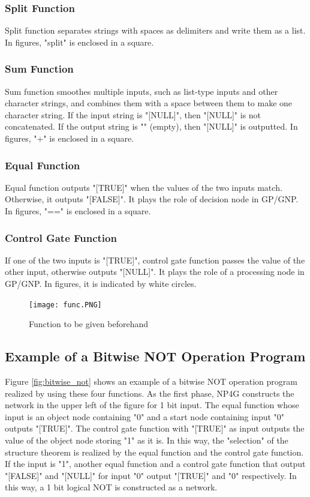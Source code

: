 \documentclass{article}
\begin{document}
\subsubsection{Split Function}
Split function separates strings with spaces as delimiters and write them as a list.
In figures, "split" is enclosed in a square.

\subsubsection{Sum Function}
Sum function smoothes multiple inputs, such as list-type inputs and other character strings, and combines them with a space between them to make one character string.
If the input string is "[NULL]", then "[NULL]" is not concatenated.
If the output string is "" (empty), then "[NULL]" is outputted.
In figures, "+" is enclosed in a square.

\subsubsection {Equal Function}
Equal function outputs "[TRUE]" when the values of the two inputs match.
Otherwise, it outputs "[FALSE]".
It plays the role of decision node in GP/GNP.
In figures, "==" is enclosed in a square.

\subsubsection {Control Gate Function}
If one of the two inputs is "[TRUE]", control gate function passes the value of the other input, otherwise outputs "[NULL]".
It plays the role of a processing node in GP/GNP.
In figures, it is indicated by white circles.

\begin{figure}[t]
\begin{center}
\texttt{[image: func.PNG]}
\end{center}
\caption {Function to be given beforehand}
\label{fig:func}
\end{figure}

\subsection {Example of a Bitwise NOT Operation Program}
Figure \ref{fig:bitwise_not} shows an example of a bitwise NOT operation program realized by using these four functions.
As the first phase, NP4G constructs the network in the upper left of the figure for 1 bit input.
The equal function whose input is an object node containing "0" and a start node containing input "0" outputs "[TRUE]".
The control gate function with "[TRUE]" as input outputs the value of the object node storing "1" as it is.
In this way, the "selection" of the structure theorem is realized by the equal function and the control gate function.
If the input is "1", another equal function and a control gate function that output "[FALSE]" and "[NULL]" for input "0" output "[TRUE]" and "0" respectively.
In this way, a 1 bit logical NOT is constructed as a network.
\end{document}
